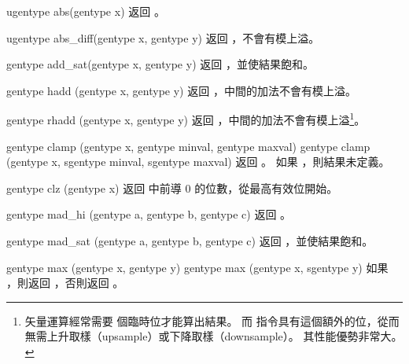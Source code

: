ugentype abs(gentype x)
\stopbuffer
{}
返回 。
\stopbuffer

ugentype abs_diff(gentype x,
		gentype y)
\stopbuffer
{}
返回 ，不會有模上溢。
\stopbuffer

gentype add_sat(gentype x,
		gentype y)
\stopbuffer
{}
返回 ，並使結果飽和。
\stopbuffer

gentype hadd (gentype x,
		gentype y)
\stopbuffer
{}
返回 ，中間的加法不會有模上溢。
\stopbuffer

gentype rhadd (gentype x,
		gentype y)
\stopbuffer
{}
返回 ，中間的加法不會有模上溢\footnote{
矢量運算經常需要  個臨時位才能算出結果。
而  指令具有這個額外的位，從而無需上升取樣（upsample）或下降取樣（downsample）。
其性能優勢非常大。}。
\stopbuffer

gentype clamp (gentype x,
		gentype minval,
		gentype maxval)
gentype clamp (gentype x,
		sgentype minval,
		sgentype maxval)
\stopbuffer
{}
返回 。
如果 ，則結果未定義。
\stopbuffer

gentype clz (gentype x)
\stopbuffer
{}
返回  中前導 0 的位數，從最高有效位開始。
\stopbuffer

gentype mad_hi (gentype a,
		gentype b,
		gentype c)
\stopbuffer
{}
返回 。
\stopbuffer

gentype mad_sat (gentype a,
		gentype b,
		gentype c)
\stopbuffer
{}
返回 ，並使結果飽和。
\stopbuffer

gentype max (gentype x, gentype y)
gentype max (gentype x, sgentype y)
\stopbuffer
{}
如果 ，則返回 ，否則返回 。
\stopbuffer

